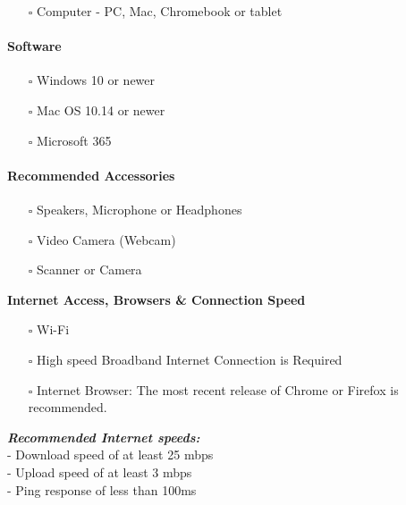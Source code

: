 \documentclass[
]{book}
\providecommand{\tightlist}{%
  \setlength{\itemsep}{0pt}\setlength{\parskip}{0pt}}
\theoremstyle{definition}
\theoremstyle{definition}
\theoremstyle{definition}
\theoremstyle{definition}
\theoremstyle{remark}
\begin{document}
\begin{itemize}
\tightlist
\item[$\square$]
  Computer - PC, Mac, Chromebook or tablet
\end{itemize}

\hypertarget{software}{%
\paragraph*{Software}\label{software}}

\begin{itemize}
\tightlist
\item[$\square$]
  Windows 10 or newer\\
\item[$\square$]
  Mac OS 10.14 or newer\\
\item[$\square$]
  Microsoft 365
\end{itemize}

\hypertarget{recommended-accessories}{%
\paragraph*{Recommended Accessories}\label{recommended-accessories}}

\begin{itemize}
\tightlist
\item[$\square$]
  Speakers, Microphone or Headphones\\
\item[$\square$]
  Video Camera (Webcam)\\
\item[$\square$]
  Scanner or Camera
\end{itemize}

\textbf{Internet Access, Browsers \& Connection Speed}

\begin{itemize}
\tightlist
\item[$\square$]
  Wi-Fi\\
\item[$\square$]
  High speed Broadband Internet Connection is Required\\
\item[$\square$]
  Internet Browser: The most recent release of Chrome or Firefox is recommended.
\end{itemize}

\textbf{\emph{Recommended Internet speeds:}}\\
- Download speed of at least 25 mbps\\
- Upload speed of at least 3 mbps\\
- Ping response of less than 100ms
\end{document}
